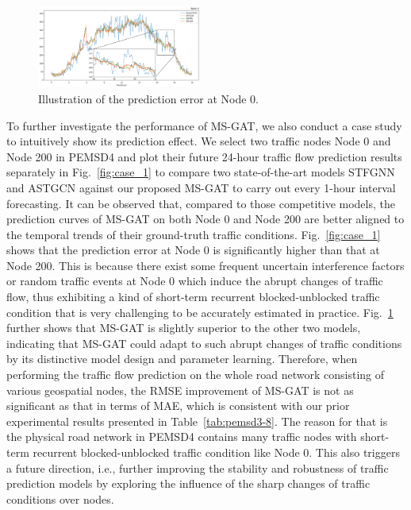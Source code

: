 \begin{figure}[!ht]
    \centering
    \includegraphics[width=0.48\textwidth]{pictures/Case_2.png}
    \caption{Illustration of the prediction error at Node 0.}
    \label{fig:case_2}
\end{figure}

To further investigate the performance of MS-GAT, we also conduct a case study to intuitively show its prediction effect. We select two traffic nodes Node 0 and Node 200 in PEMSD4 and plot their future 24-hour traffic flow prediction results separately in Fig.~\ref{fig:case_1} to compare two state-of-the-art models STFGNN  and ASTGCN  against our proposed MS-GAT to carry out every 1-hour interval forecasting. It can be observed that, compared to those competitive models, the prediction curves of MS-GAT on both Node 0 and Node 200 are better aligned to the temporal trends of their ground-truth traffic conditions. Fig.~\ref{fig:case_1} shows that the prediction error at Node 0 is significantly higher than that at Node 200. This is because there exist some frequent uncertain interference factors or random traffic events at Node 0 which induce the abrupt changes of traffic flow, thus exhibiting a kind of short-term recurrent blocked-unblocked traffic condition that is very challenging to be accurately estimated in practice. Fig.~\ref{fig:case_2} further shows that MS-GAT is slightly superior to the other two models, indicating that MS-GAT could adapt to such  abrupt changes of traffic conditions by its distinctive model design and parameter learning. Therefore, when performing the traffic flow prediction on the whole road network consisting of various geospatial nodes, the RMSE improvement of MS-GAT is not as significant as that in terms of MAE, which is consistent with our prior experimental results presented in Table~\ref{tab:pemsd3-8}. The reason for that is the physical road network in PEMSD4 contains many traffic nodes with short-term recurrent blocked-unblocked traffic condition like Node 0. This also triggers a future direction, i.e., further improving the stability and robustness of traffic prediction models by exploring the influence of the sharp changes of traffic conditions over nodes.


